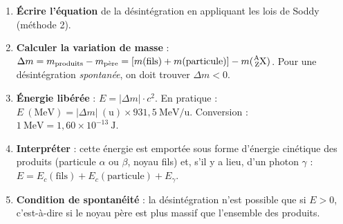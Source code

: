 \documentclass[11pt]{article}
\begin{document}
\begin{methode}
\begin{enumerate}
\item \textbf{Écrire l'équation} de la désintégration en appliquant les lois de Soddy (méthode 2).
\item \textbf{Calculer la variation de masse} : $\Delta m = m_{\text{produits}} - m_{\text{père}} = \left[m(\text{fils}) + m(\text{particule})\right] - m(\ce{^{A}_{Z}X})$. Pour une désintégration \emph{spontanée}, on doit trouver $\Delta m < 0$.
\item \textbf{Énergie libérée} : $E = |\Delta m| \cdot c^2$. En pratique : $E\ (\mathrm{MeV}) = |\Delta m|\ (\mathrm{u}) \times 931{,}5\ \mathrm{MeV/u}$. Conversion : $1\ \mathrm{MeV} = 1{,}60 \times 10^{-13}\ \mathrm{J}$.
\item \textbf{Interpréter} : cette énergie est emportée sous forme d'énergie cinétique des produits (particule $\alpha$ ou $\beta$, noyau fils) et, s'il y a lieu, d'un photon $\gamma$ : $E = E_c(\text{fils}) + E_c(\text{particule}) + E_\gamma$.
\item \textbf{Condition de spontanéité} : la désintégration n'est possible que si $E > 0$, c'est-à-dire si le noyau père est plus massif que l'ensemble des produits.
\end{enumerate}
\end{methode}
\end{document}
